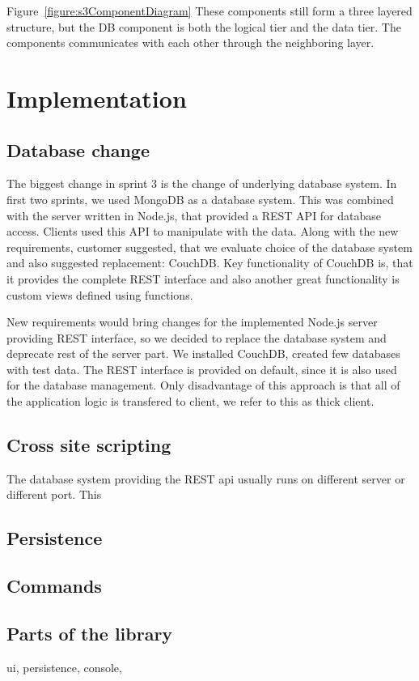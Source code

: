 Figure~\ref{figure:s3ComponentDiagram} These components still form a three layered structure, but the DB component is both the logical tier and the data tier. The components communicates with each other through the neighboring layer.


\section{Implementation}
\subsection{Database change}
The biggest change in sprint 3 is the change of underlying database system. In first two sprints, we used MongoDB as a database system. This was combined with the server written in Node.js, that provided a REST API for database access. Clients used this API to manipulate with the data. Along with the new requirements, customer suggested, that we evaluate choice of the database system and also suggested replacement: CouchDB. Key functionality of CouchDB is, that it provides the complete REST interface and also another great functionality is custom views defined using functions.

New requirements would bring changes for the implemented Node.js server providing REST interface, so we decided to replace the database system and deprecate rest of the server part. We installed CouchDB, created few databases with test data. The REST interface is provided on default, since it is also used for the database management. Only disadvantage of this approach is that all of the application logic is transfered to client, we refer to this as thick client.


\subsection{Cross site scripting}
The database system providing the REST api usually runs on different server or different port. This 


\subsection{Persistence}

\subsection{Commands}

\subsection{Parts of the library}
ui, persistence, console, 

